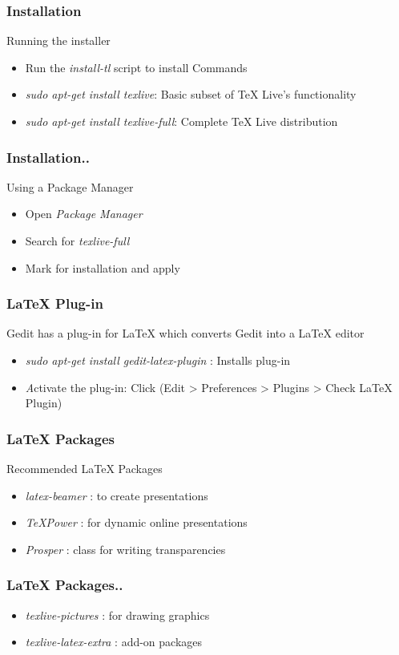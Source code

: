 \documentclass[17pt,compress]{beamer}
\begin{document}
\begin{frame}[fragile]
  \frametitle{Installation}
  Running the installer
  \begin{itemize}
  \item Run the \emph{install-tl} script to install
  Commands
  \item \emph{sudo apt-get install texlive}: 
             Basic subset of TeX Live's functionality
  \item \emph{sudo apt-get install texlive-full}: 
             Complete TeX Live distribution
  \end{itemize}
\end{frame}

\begin{frame}[fragile]
  \frametitle{Installation..}
  Using a Package Manager
  \begin{itemize}
  \item Open \emph{Package Manager}
  \item Search for \emph{texlive-full}
  \item Mark for installation and apply
  \end{itemize}
\end{frame}

\begin{frame}[fragile]
  \frametitle{LaTeX Plug-in}
  Gedit has a plug-in for LaTeX which converts Gedit into a LaTeX editor
  \begin{itemize}
  \item \emph{sudo apt-get install gedit-latex-plugin} : Installs plug-in
  \item \emph Activate the plug-in: 
              Click (Edit > Preferences > Plugins > Check LaTeX Plugin)
  \end{itemize}
\end{frame}

\begin{frame}[fragile]
  \frametitle{LaTeX Packages}
  Recommended LaTeX Packages
  \begin{itemize}
  \item \emph{latex-beamer} : to create presentations
  \item \emph{TeXPower} : for dynamic online presentations
  \item \emph{Prosper} : class for writing transparencies
  \end{itemize}
\end{frame}

\begin{frame}[fragile]
  \frametitle{LaTeX Packages..}
  \begin{itemize}
  \item \emph{texlive-pictures} : for drawing graphics
  \item \emph{texlive-latex-extra} : add-on packages
  \end{itemize}
\end{frame}
\end{document}
